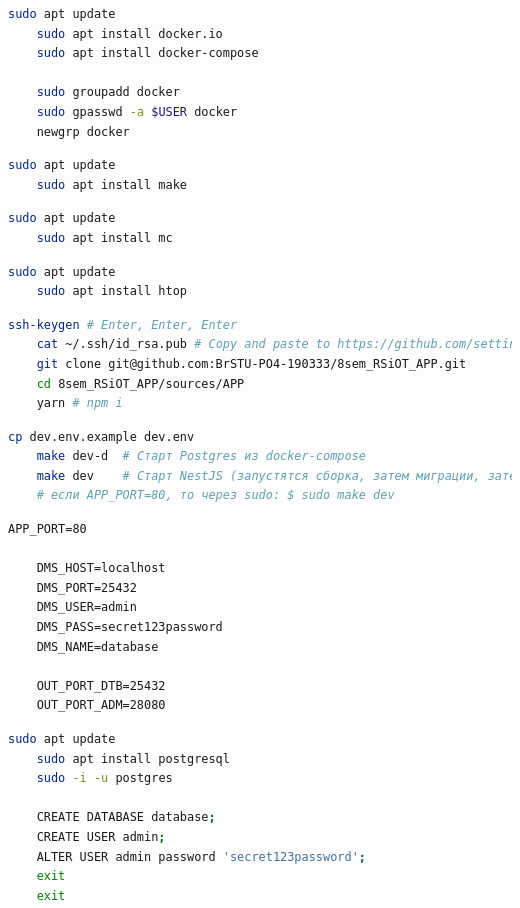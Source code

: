 \documentclass[12pt, a4paper, simple]{eskdtext}
\begin{document}
  \begin{lstlisting}[language=bash,name=Установка Docker и docker-compose]
    sudo apt update
    sudo apt install docker.io
    sudo apt install docker-compose
    
    sudo groupadd docker
    sudo gpasswd -a $USER docker
    newgrp docker
  \end{lstlisting}

  \begin{lstlisting}[language=bash,name=Установка make (для Makefile)]
    sudo apt update
    sudo apt install make
  \end{lstlisting}

  \begin{lstlisting}[language=bash,name=Установка консольного файлового менеджера mc]
    sudo apt update
    sudo apt install mc
  \end{lstlisting}

  \begin{lstlisting}[language=bash,name=Установка консольного диспетчера задач htop]
    sudo apt update
    sudo apt install htop
  \end{lstlisting}

  \begin{lstlisting}[language=bash,name=Клонирования репозитория]
    ssh-keygen # Enter, Enter, Enter
    cat ~/.ssh/id_rsa.pub # Copy and paste to https://github.com/settings/ssh/new
    git clone git@github.com:BrSTU-PO4-190333/8sem_RSiOT_APP.git
    cd 8sem_RSiOT_APP/sources/APP
    yarn # npm i
  \end{lstlisting}

  \begin{lstlisting}[language=bash,name=Запуск режима dev]
    cp dev.env.example dev.env
    make dev-d  # Старт Postgres из docker-compose
    make dev    # Старт NestJS (запустятся сборка, затем миграции, затем приложение)
    # если APP_PORT=80, то через sudo: $ sudo make dev
  \end{lstlisting}

  \begin{lstlisting}[name=dev.env для c БД в docker-compose]
    APP_PORT=80

    DMS_HOST=localhost
    DMS_PORT=25432
    DMS_USER=admin
    DMS_PASS=secret123password
    DMS_NAME=database

    OUT_PORT_DTB=25432
    OUT_PORT_ADM=28080
  \end{lstlisting}

  \begin{lstlisting}[language=bash,name=Установка Postresql]
    sudo apt update
    sudo apt install postgresql
    sudo -i -u postgres
  
    CREATE DATABASE database;
    CREATE USER admin;
    ALTER USER admin password 'secret123password';
    exit
    exit
  \end{lstlisting}
\end{document}
